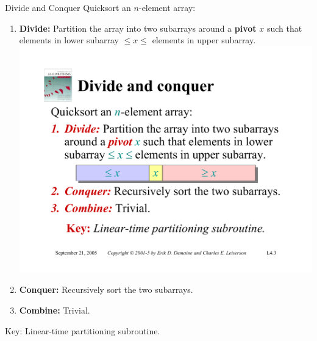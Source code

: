 \documentclass{beamer}
\begin{document}
\begin{frame}{Divide and Conquer}
    Quicksort an $n$-element array:
    \begin{enumerate}
        \item \textbf{\Large Divide:} Partition the array into two subarrays around a \textbf{pivot} $x$ such that elements in lower subarray $\leq x \leq$ elements in upper subarray.
            \includegraphics[width=\textwidth, trim={2cm 7.25cm 2cm 9.75cm}, clip]{pages/lec4_3} 
        \item \textbf{\Large Conquer:} Recursively sort the two subarrays.
        \item \textbf{\Large Combine:} Trivial.
    \end{enumerate}
    \begin{alertblock}{Key:}
        Linear-time partitioning subroutine.
    \end{alertblock}
\end{frame}
\end{document}
